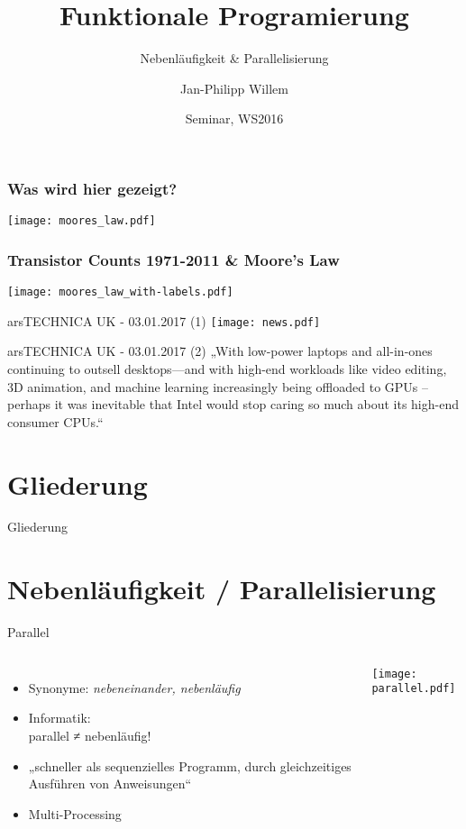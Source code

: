\documentclass[compress]{beamer}
\title{Funktionale \break Programierung}
\subtitle{Nebenläufigkeit \& Parallelisierung}
\author{Jan-Philipp Willem}
\institute{Prof. Dr. Sandro Leuchter\\
  Fakultät für Informatik\\
  Hochschule Mannheim
}
\date{Seminar, WS2016}
\begin{document}
\begin{frame}
  \frametitle{Was wird hier gezeigt?}
  \texttt{[image: moores\_law.pdf]}
\end{frame}

\begin{frame}
  \frametitle{Transistor Counts 1971-2011 \& Moore's Law}
  \texttt{[image: moores\_law\_with-labels.pdf]}
\end{frame}

\begin{frame}{arsTECHNICA UK - 03.01.2017 (1)}
  \texttt{[image: news.pdf]}
\end{frame}

\begin{frame}{arsTECHNICA UK - 03.01.2017 (2)}
  „With low-power laptops and all-in-ones continuing to outsell desktops—and with high-end workloads like video editing, 3D animation, and machine learning increasingly being offloaded to GPUs -- perhaps it was inevitable that Intel would stop caring so much about its high-end consumer CPUs.“
\end{frame}
\maketitle

\section*{Gliederung}
\begin{frame}{Gliederung}
  \tableofcontents[hideallsubsections]
\end{frame}

\section{Nebenläufigkeit / Parallelisierung}
  \begin{frame}{Parallel}
  \setcounter{framenumber}{1}
    \begin{columns}[c]
      \begin{itemize}
        \item Synonyme: \textit{nebeneinander, nebenläufig}
        \item Informatik:\\parallel ≠ nebenläufig!
        \item „schneller als sequenzielles Programm, durch gleichzeitiges Ausführen von \alert{Anweisungen}“
        \item Multi-Processing
      \end{itemize}
    \texttt{[image: parallel.pdf]}
    \end{columns}
  \end{frame}
\end{document}
